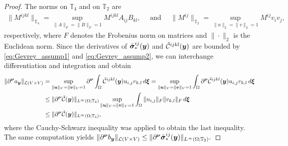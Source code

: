 \begin{proof}
    The norms on $\mathbb{T}_4$ and on $\mathbb{T}_2$ are
    \begin{align*}
        \| M^{ijkl}\|_{\mathbb{T}_4} = \sup_{ \| A \|_F  = \| B \|_F = 1}    M^{ijkl} A_{ij}B_{kl}, \quad \text{ and } \quad 
        \| M^{ij} \|_{\mathbb{T}_2} = \sup_{ \|u \|_2 = \| v \|_2 =1} M^{ij}v_i v_j,
    \end{align*}
    respectively, where $F$ denotes the Frobenius norm on matrices and $\| \cdot \|_2$ is the Euclidean norm. 
    Since the derivatives of $\tilde{\boldsymbol{\sigma}}^{ij}_*({\boldsymbol{y}})$ and $\tilde{\mathcal{C}}^{ijkl}({\boldsymbol{y}})$ are bounded by \eqref{eq:Gevrey_assump1} and \eqref{eq:Gevrey_assump2}, we can interchange differentiation and integration and obtain
    \begin{align*}
         \| \partial^{{\boldsymbol{\nu}} } a_{\boldsymbol{y}} \|_{\mathcal{L}(V \times V) } &=  \sup_{ \| {\boldsymbol{u}} \|_V = \| {\boldsymbol{v}} \|_V =1  } \partial^{{\boldsymbol{\nu}}} \int_{\Omega} \tilde{\mathcal{C}}^{ijkl}({\boldsymbol{y}}) u_{i,j} v_{k,l} \mathop{d\boldsymbol{\xi}} =    \sup_{ \| {\boldsymbol{u}} \|_V = \| {\boldsymbol{v}} \|_V =1  } \int_{\Omega} \partial^{{\boldsymbol{\nu}}} \tilde{\mathcal{C}}^{ijkl}({\boldsymbol{y}}) u_{i,j} v_{k,l} \mathop{d\boldsymbol{\xi}}
         \\
         &\leq  \| \partial^{{\boldsymbol{\nu}}} \tilde{\mathcal{C}} ({\boldsymbol{y}})\|_{L^\infty(\Omega;\mathbb{T}_4) } \sup_{ \| {\boldsymbol{u}} \|_V = \| {\boldsymbol{v}} \|_V =1  } \int_{\Omega}  \| u_{i,j} \|_F \|v_{k,l} \|_F \mathop{d\boldsymbol{\xi}} \\
         &\leq   \| \partial^{{\boldsymbol{\nu}}} \tilde{\mathcal{C}} ({\boldsymbol{y}})\|_{L^\infty(\Omega;\mathbb{T}_4) },
    \end{align*}
    where the Cauchy-Schwarz inequality was applied to obtain the last inequality.
    The same computation yields $  \| \partial^{{\boldsymbol{\nu}} } b_{\boldsymbol{y}} \|_{\mathcal{L}(V \times V) }   \leq\| \partial^{{\boldsymbol{\nu}}} \tilde{\boldsymbol{\sigma}}_*^{ij} ({\boldsymbol{y}})\|_{L^\infty(\Omega;\mathbb{T}_2) }.$
\end{proof}



